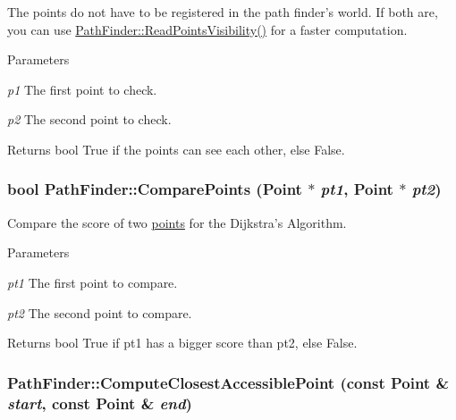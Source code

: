 The points do not have to be registered in the path finder's world. If both are, you can use \hyperlink{classPathFinder_ab8c06520b832da1cda6f781177af982b}{PathFinder::ReadPointsVisibility()} for a faster computation.


\begin{DoxyParams}{Parameters}
\item[{\em p1}]The first point to check. \item[{\em p2}]The second point to check. \end{DoxyParams}
\begin{DoxyReturn}{Returns}
bool True if the points can see each other, else False. 
\end{DoxyReturn}
\hypertarget{classPathFinder_a35649ba9507af0f7c450932ae92a149f}{
\subsubsection[{ComparePoints}]{\setlength{\rightskip}{0pt plus 5cm}bool PathFinder::ComparePoints ({\bf Point} $\ast$ {\em pt1}, \/  {\bf Point} $\ast$ {\em pt2})}}
\label{classPathFinder_a35649ba9507af0f7c450932ae92a149f}


Compare the score of two \hyperlink{structPathFinder_1_1Point}{points} for the Dijkstra's Algorithm. 


\begin{DoxyParams}{Parameters}
\item[{\em pt1}]The first point to compare. \item[{\em pt2}]The second point to compare. \end{DoxyParams}
\begin{DoxyReturn}{Returns}
bool True if pt1 has a bigger score than pt2, else False. 
\end{DoxyReturn}
\hypertarget{classPathFinder_a1ea7cda7d83a2474efa4af71f0025d94}{
\subsubsection[{ComputeClosestAccessiblePoint}]{ PathFinder::ComputeClosestAccessiblePoint (const {\bf Point} \& {\em start}, \/  const {\bf Point} \& {\em end})}}
\label{classPathFinder_a1ea7cda7d83a2474efa4af71f0025d94}


